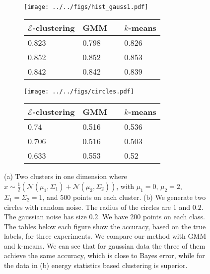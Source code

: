 \documentclass[simplex.tex]{subfiles}
\begin{document}
\begin{figure}[h!]
\begin{cframed}
\centering
\begin{subfigure}[t]{0.45\textwidth}
\centering
\texttt{[image: ../../figs/hist\_gauss1.pdf]}\\
\begin{tabular}{ l l l}
\hline
$\mathcal{E}$-clustering &  GMM~~ & $k$-means \\
\hline
0.823 &
0.798 &
0.826 \\
0.852 & 
0.852 & 
0.853 \\
0.842 &
0.842 &
0.839 \\
\hline
\end{tabular}
\end{subfigure}
\begin{subfigure}[t]{0.45\textwidth}
\centering
\texttt{[image: ../../figs/circles.pdf]}
\begin{tabular}{ l l l}
\hline
$\mathcal{E}$-clustering & GMM~~ & $k$-means \\
\hline
0.74 &
0.516 &
0.536 \\
0.706 &
0.516 &
0.503 \\
0.633 &
0.553 &
0.52 \\
\hline
\end{tabular}
\end{subfigure}
\caption{
(a) Two clusters in one dimension where
$x \sim \tfrac{1}{2}\left( \mathcal{N}(\mu_1, \Sigma_1) +
\mathcal{N}(\mu_2, \Sigma_2)\right)$, with $\mu_1 = 0$, $\mu_2=2$,
$\Sigma_1 = \Sigma_2 = 1$,
and $500$ points on each cluster. 
(b) We generate two circles with random noise.
The radius of the circles are $1$ and $0.2$. The gaussian noise has size $0.2$.
We have 200 points on each class. The tables below each figure show
the accuracy, based on the true labels, for three experiments.
We compare our method with GMM and k-means. We can see that for gaussian
data the three of them achieve the same accuracy, which is close to Bayes
error, while for the data in
(b) energy statistics based clustering is superior.
}
\label{fig:nonpar}
\end{cframed}
\end{figure}
\clearpage
\end{document}
